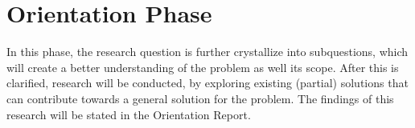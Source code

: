 \section{Orientation Phase}
In this phase, the research question is further crystallize into subquestions, which will create a better understanding of the problem as well its scope. After this is clarified, research will be conducted, by exploring existing (partial) solutions that can contribute towards a general solution for the problem. The findings of this research will be stated in the Orientation Report.

